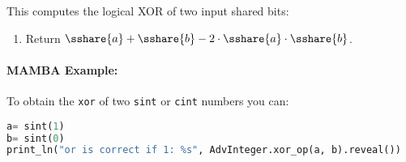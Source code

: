 This computes the logical XOR of two input shared bits:
\begin{enumerate}
  \item Return $\sshare{a}+\sshare{b}-2 \cdot \sshare{a} \cdot \sshare{b}$.
\end{enumerate}
\paragraph{MAMBA Example:} To obtain the \verb|xor| of two \verb|sint| or \verb|cint| numbers you can:
\begin{lstlisting}[language={python}]
a= sint(1)
b= sint(0)
print_ln("or is correct if 1: %s", AdvInteger.xor_op(a, b).reveal())
\end{lstlisting}

\iffalse
  \note{Nigel}{Does not seem to be used anywhere}
  \msubsubsection{$\mathsf{Symm}(f,\sshare{a_1},\ldots,\sshare{a_t})$:}
  This takes a symmetric boolean function $f$ on $t$ binary inputs
  and evaluates it at the points $\sshare{a_1},\ldots,\sshare{a_t}$,
  where we assume $a_i \in \{0,1\}$.
  We first pre-process the function $f$ so that we can write
  \[ f(x_1,\ldots,x_t) = \phi(1+\sum_{i=1}^t x_i), \]
  where the inner sum is over the integers and
  $\phi:{1,2,\ldots,t+1} \longrightarrow \{0,1\}$.
  We then write
  \[ \phi(X) = \sum_{i=0}^t \alpha_i \cdot X^i \pmod{p} \]
  using Lagrange interpolation.
  So for example if we have $f(X_1,X_2)=X_1^2+X_1 \cdot X_2+X_2^2+1$
  then $\phi$ is the function which maps
  $1 \longrightarrow 1$, $2 \longrightarrow 0$, $3 \longrightarrow 0$.
  In which case $\phi(X)=X^2/2-5 \cdot X/2+3$.

  To compute this function we have the algorithm
  \begin{enumerate}
    \item $\sshare{a} \asn 1+ \sum_{i=1}^t \sshare{a_i}$.
    \item $(\sshare{a},\sshare{a^2},\ldots,\sshare{a^t})
            \asn \mathsf{PreMult}(\sshare{a},\ldots,\sshare{a},
            \{(1,1),\ldots,(1,t)\})$.
    \item $\sshare{f(a_1,\ldots,a_t)}
            \asn \sum_{i=0}^t \alpha_i \cdot \sshare{a^i}$.
  \end{enumerate}
\fi

